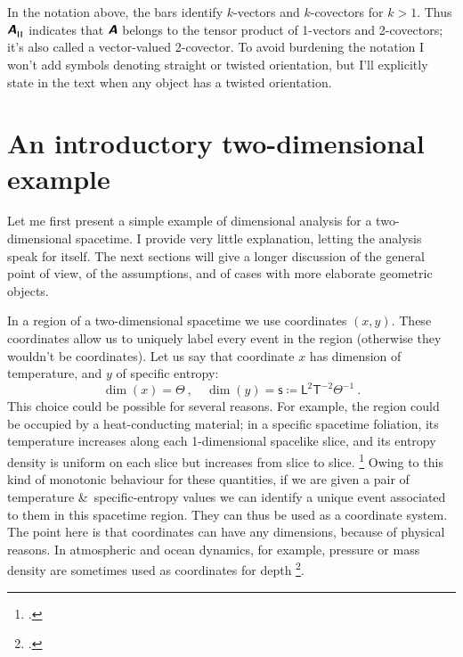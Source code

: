 \documentclass[\ifafour a4paper,12pt,\else a5paper,10pt,\fi%
onecolumn,oneside,article,%
british%
]{memoir}
\makeatletter
\theoremstyle{remark}
\theoremstyle{innote}
\newcommand*{\mathte}[1]{\textbf{\textit{\textsf{#1}}}}
\newcommand*{\citep}{\footcites}
\newcommand*{\amp}{\&}
\newcommand*{\defd}{\coloneqq}
\renewcommand*{\|}[1][]{\nonscript\,#1\vert\nonscript\;\mathopen{}}
\newcommand*{\sect}{\S}%
\newcommand*{\chap}{ch.}%
\newcommand*{\eg}{{e.g.}}
\newcommand*{\q}{}%
\DeclareRobustCommand*{\q}{%
  \mathord{\mathpalette\bigcdot@{}}%
}
\newcommand*{\bigcdot@scalefactor}{0.7}
\newcommand*{\bigcdot@widthfactor}{1.5}
\newcommand*{\bigcdot@}[2]{%
  \sbox0{$#1\vcenter{}$}%
  \sbox2{$#1\cdot\m@th$}%
  \hbox to \bigcdot@widthfactor\wd2{%
    \hfil
    \raise\ht0\hbox{%
      \scalebox{\bigcdot@scalefactor}{%
        \lower\ht0\hbox{$#1\bullet\m@th$}%
      }%
    }%
    \hfil
  }%
}
\newcommand*{\Le}{\textsf{L}}
\newcommand*{\Ti}{\textsf{T}}
\newcommand*{\Te}{\Theta}
\newcommand*{\Ent}{\textsf{s}}
\newcommand*{\yA}{\mathte{A}}
\renewcommand*{\i}{\indices}
\newcommand*{\rul}{{\mkern2mu\rule[-0.1ex]{0.75pt}{1.1ex}\mkern2mu}}
\DeclarePairedDelimiter\mul{\rul}{\rul}%
\makeatother
\begin{document}
In the notation above, the bars identify $k$-vectors and $k$-covectors for
$k>1$. Thus $\yA\i{^{\q}_{\mul{\q\q}}}$ indicates that $\yA$ belongs to the
tensor product of 1-vectors and 2-covectors; it's also called a
vector-valued 2-covector. To avoid burdening the notation I won't add
symbols denoting straight or twisted orientation, but I'll explicitly state
in the text when any object has a twisted orientation.










\section{An introductory two-dimensional example}
\label{sec:2d_example}

Let me first present a simple example of dimensional analysis for a
two-dimensional spacetime. I provide very little explanation, letting the
analysis speak for itself. The next sections will give a longer discussion
of the general point of view, of the assumptions, and of cases with more
elaborate geometric objects.

In a region of a two-dimensional spacetime we use coordinates $(x,y)$.
These coordinates allow us to uniquely label every event in the region
(otherwise they wouldn't be coordinates). Let us say that coordinate $x$
has dimension of temperature, and $y$ of specific entropy:
\begin{equation}
  \label{eq:example_coords2d}
  \dim(x)=\Te \ ,\quad
  \dim(y)= \Ent \defd \Le^{2}\Ti^{-2}\Te^{-1} \ .
\end{equation}
This choice could be possible for several reasons. For example, the region
could be occupied by a heat-conducting material; in a specific spacetime
foliation, its temperature increases along each 1-dimensional spacelike
slice, and its entropy density is uniform on each slice but increases from
slice to slice. \citep[For general-relativistic thermomechanics see
\eg][]{eckart1940c,maugin1974b,maugin1978b,maugin1978c,maugin1978d,maugin1978e,muschiketal2014}
Owing to this kind of monotonic behaviour for these quantities, if we are
given a pair of temperature \amp\ specific-entropy values we can identify a
unique event associated to them in this spacetime region. They can thus be
used as a coordinate system. The point here is that coordinates can have
any dimensions, because of physical reasons. In atmospheric and ocean
dynamics, for example, pressure or mass density are sometimes used as
coordinates for depth
\citep[\chap~6]{griffies2004}[\sect~2.6.2]{vallis2006}.
\end{document}
